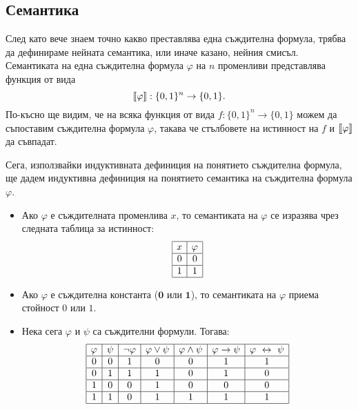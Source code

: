  
\subsection{Семантика}

След като вече знаем точно какво преставлява една съждителна формула, трябва да дефинираме нейната семантика, или 
иначе казано, нейния смисъл.
Семантиката на една съждителна формула $\varphi$ на $n$ променливи представлява функция от вида
\[\val{\varphi}:\{0,1\}^n \to \{0,1\}.\]
По-късно ще видим, че на всяка функция от вида $f:\{0,1\}^n \to \{0,1\}$ можем да съпоставим съждителна формула $\varphi$,
такава че стълбовете на истинност на $f$ и $\val{\varphi}$ да съвпадат.

Сега, използвайки индуктивната дефиниция на понятието съждителна формула, ще дадем индуктивна дефиниция на 
понятието семантика на съждителна формула $\varphi$.
\begin{itemize}
\item 
  Ако $\varphi$ е съждителната променлива $x$, то семантиката на $\varphi$ се изразява чрез следната таблица за истинност:
  \[
  \begin{array}{|c|c|}
    \hline
    x & \varphi \\
    \hline
    0 & 0 \\
    \hline
    1 & 1 \\
    \hline
  \end{array}
  \]
\item
  Ако $\varphi$ е съждителна константа ($\mathbf{0}$ или $\mathbf{1}$), 
  то семантиката на $\varphi$ приема стойност $0$ или $1$.
\item
  Нека сега $\varphi$ и $\psi$ са съждителни формули. Тогава:
  \[
  \begin{array}{|c|c|c|c|c|c|c|}
    \hline
    \varphi & \psi & \neg \varphi & \varphi \vee \psi & \varphi \wedge \psi & \varphi \rightarrow \psi & \varphi \iff \psi \\
    \hline
    0 & 0 & 1 & 0 & 0 & 1 & 1 \\
    \hline
    0 & 1 & 1 & 1 & 0 & 1 & 0 \\
    \hline
    1 & 0 & 0 & 1 & 0 & 0 & 0 \\
    \hline
    1 & 1 & 0 & 1 & 1 & 1 & 1 \\
    \hline
  \end{array}
  \]
\end{itemize}

